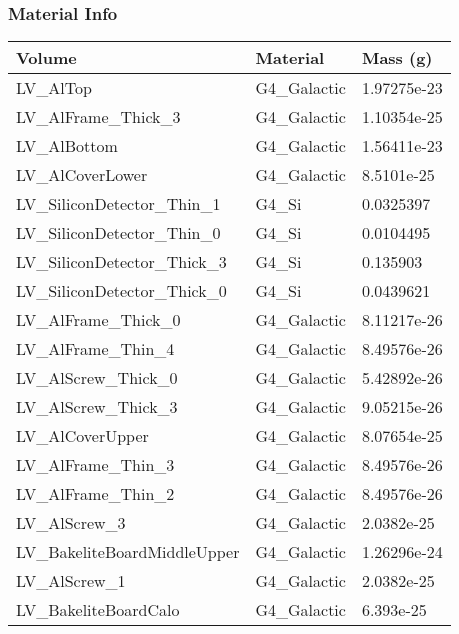 \documentclass[8pt]{beamer}
\begin{document}
            \begin{frame}
                \frametitle{Material Info}
            
            \begin{table}
            \begin{tabular}{lll}
             Volume & Material & Mass (g) \\
                    
            \midrule
            LV\_AlTop & G4\_Galactic & 1.97275e-23\\
                        LV\_AlFrame\_Thick\_3 & G4\_Galactic & 1.10354e-25\\
                        LV\_AlBottom & G4\_Galactic & 1.56411e-23\\
                        LV\_AlCoverLower & G4\_Galactic & 8.5101e-25\\
                        LV\_SiliconDetector\_Thin\_1 & G4\_Si & 0.0325397\\
                        LV\_SiliconDetector\_Thin\_0 & G4\_Si & 0.0104495\\
                        LV\_SiliconDetector\_Thick\_3 & G4\_Si & 0.135903\\
                        LV\_SiliconDetector\_Thick\_0 & G4\_Si & 0.0439621\\
                        LV\_AlFrame\_Thick\_0 & G4\_Galactic & 8.11217e-26\\
                        LV\_AlFrame\_Thin\_4 & G4\_Galactic & 8.49576e-26\\
                        LV\_AlScrew\_Thick\_0 & G4\_Galactic & 5.42892e-26\\
                        LV\_AlScrew\_Thick\_3 & G4\_Galactic & 9.05215e-26\\
                        LV\_AlCoverUpper & G4\_Galactic & 8.07654e-25\\
                        LV\_AlFrame\_Thin\_3 & G4\_Galactic & 8.49576e-26\\
                        LV\_AlFrame\_Thin\_2 & G4\_Galactic & 8.49576e-26\\
                        LV\_AlScrew\_3 & G4\_Galactic & 2.0382e-25\\
                        LV\_BakeliteBoardMiddleUpper & G4\_Galactic & 1.26296e-24\\
                        LV\_AlScrew\_1 & G4\_Galactic & 2.0382e-25\\
                        LV\_BakeliteBoardCalo & G4\_Galactic & 6.393e-25\\

\end{tabular}
\end{table}
\end{frame}
\end{document}
